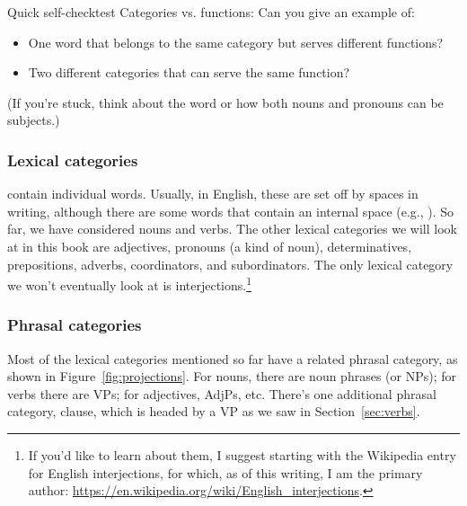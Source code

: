 \begin{tblsframedsymbol}{Quick self-check}{test}
Categories vs. functions: Can you give an example of:
\begin{itemize}[noitemsep, leftmargin=*]
    \item One word that belongs to the same category but serves different functions?
    \item Two different categories that can serve the same function?
\end{itemize}
(If you're stuck, think about the word  or how both nouns and pronouns can be subjects.)
\end{tblsframedsymbol}

\subsubsection*{Lexical categories}

 contain individual words. Usually, in English, these are set off by spaces in writing, although there are some words that contain an internal space (e.g., ). So far, we have considered nouns and verbs. The other lexical categories we will look at in this book are adjectives, pronouns (a kind of noun), determinatives, prepositions, adverbs, coordinators, and subordinators. The only lexical category we won't eventually look at is interjections.\footnote{If you'd like to learn about them, I suggest starting with the Wikipedia entry for English interjections, for which, as of this writing, I am the primary author: \url{https://en.wikipedia.org/wiki/English_interjections}.}

\subsubsection*{Phrasal categories}

Most of the lexical categories mentioned so far have a related phrasal category, as shown in Figure~\ref{fig:projections}. For nouns, there are noun phrases (or NPs); for verbs there are VPs; for adjectives, AdjPs, etc. There's one additional phrasal category, clause, which is headed by a VP as we saw in Section~\ref{sec:verbs}.


